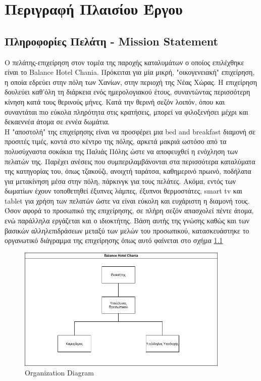 \chapter{Περιγραφή Πλαισίου Έργου}
\section{Πληροφορίες Πελάτη - Mission Statement}
Ο πελάτης-επιχείρηση στον τομέα της παροχής καταλυμάτων ο οποίος επιλέχθηκε είναι το Balance Hotel
Chania. Πρόκειται για μία μικρή, "οικογενειακή" επιχείρηση, η οποία εδρεύει στην πόλη των Χανίων, στην
περιοχή της Νέας Χώρας. Η επιχείρηση δουλεύει καθ'όλη τη διάρκεια ενός ημερολογιακού έτους, 
συναντώντας περισσότερη κίνηση κατά τους θερινούς μήνες. Κατά την θερινή σεζόν λοιπόν, όπου και
συναντάται πιο εύκολα πληρότητα στις κρατήσεις, μπορεί να φιλοξενήσει μέχρι και δεκαεννέα άτομα σε 
εννέα δωμάτια.\\ 

\noindent
Η "αποστολή" της επιχείρησης είναι  να προσφέρει μια bed and breakfast διαμονή σε προσιτές τιμές, 
κοντά στο κέντρο της πόλης, αρκετά μακριά ωστόσο από τα πολυσύχναστα σοκάκια της Παλιάς Πόλης 
ώστε να αποφευχθεί η ενόχληση των πελατών της. Παρέχει ανέσεις που συμπεριλαμβάνονται στα 
περισσότερα καταλύματα της κατηγορίας του, όπως τζακούζι, ανοιχτή ταράτσα, καθημερινό πρωινό, 
ποδήλατα για μετακίνηση μέσα στην πόλη, πάρκινγκ για τους πελάτες. Ακόμα, εντός των δωματίων 
έχουν τοποθετηθεί έξυπνες λάμπες, έξυπνοι θερμοστάτες, smart tv και tablet για χρήση των πελατών
ώστε να είναι εύκολη και ευχάριστη η διαμονή τους. \\

\noindent
Όσον αφορά το προσωπικό της επιχείρησης, σε πλήρη σεζόν απασχολεί πέντε άτομα, ενώ παράλληλα 
εργάζεται και ο ιδιοκτήτης. Βάση αυτής της γνώσης καθώς και των βασικών αλληλεπιδράσεων μεταξύ 
των μελών του προσωπικού, κατασκευάστηκε το οργανωτικό διάγραμμα της επιχείρησης όπως αυτό φαίνεται στο σχήμα \ref{organ_diag} 
\begin{figure}[H]
	\centering
	 \includegraphics[width=0.9\textwidth]{Images/organization}
	 \caption{Organization Diagram}
	\label{organ_diag}
\end{figure}


